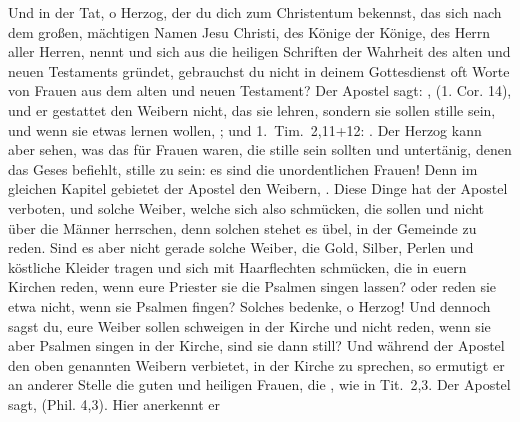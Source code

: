{    Und in der Tat, o Herzog, der du dich zum Christentum bekennst, 
    das sich nach dem großen, mächtigen Namen Jesu Christi,
    des Könige der Könige, des Herrn aller Herren, nennt und sich
    aus die heiligen Schriften der Wahrheit des alten und neuen
    Testaments gründet, gebrauchst du nicht in deinem Gottesdienst
    oft Worte von Frauen aus dem alten und neuen Testament? Der
    Apostel sagt: ,
    (1. Cor. 14), und er gestattet 
    den Weibern nicht, das sie lehren,
    sondern sie sollen stille sein, und wenn sie etwas lernen wollen,
    ; und 
    1.~Tim.~2,11+12: . Der Herzog kann aber sehen, was das für
    Frauen waren, die stille sein sollten und untertänig, denen das
    Geses befiehlt, stille zu sein: es sind die unordentlichen Frauen!
    Denn im gleichen Kapitel gebietet der Apostel den Weibern, . Diese Dinge hat der Apostel verboten, und solche
    Weiber, welche sich also schmücken, die sollen  und nicht über die Männer herrschen, denn
    solchen stehet es übel, in der Gemeinde zu reden. Sind es aber
    nicht gerade solche Weiber, die Gold, Silber, Perlen und köstliche
    Kleider tragen und sich mit Haarflechten schmücken, die in euern
    Kirchen reden, wenn eure Priester sie die Psalmen singen lassen?
    oder reden sie etwa nicht, wenn sie Psalmen fingen? Solches 
    bedenke, o Herzog! Und dennoch sagst du, eure Weiber sollen schweigen
    in der Kirche und nicht reden, wenn sie aber Psalmen singen in
    der Kirche, sind sie dann still? Und während der Apostel den
    oben genannten Weibern verbietet, in der Kirche zu sprechen, so
    ermutigt er an anderer Stelle die guten und heiligen Frauen, die
    , wie in 
    Tit.~2,3. Der Apostel
    sagt, 
    (Phil. 4,3). Hier anerkennt er 
}
